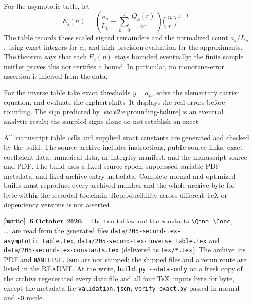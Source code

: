 \documentclass[11pt,letterpaper]{article}
\numberwithin{equation}{section}
\theoremstyle{remark}\newtheorem{remark}[theorem]{Remark}
\newcommand{\file}[1]{\nolinkurl{#1}}
\newenvironment{writenote}[1][]{\par\smallskip\begingroup\small
 \noindent\textbf{[write]}\if\relax\detokenize{#1}\relax\else~\textbf{#1.}\fi\ }%
 {\par\endgroup\smallskip}
\begin{document}
For the asymptotic table, let
\[
 E_j(n)=\left(\frac{a_n}{L_n}-\sum_{k=0}^j\frac{Q_k(r)}{n^k}\right)\left(\frac nr\right)^{j+1}.
\]
The table records these scaled signed remainders and the normalized count $a_n/L_n$, using exact integers for $a_n$ and high-precision evaluation for the approximants. The theorem says that each $E_j(n)$ stays bounded eventually; the finite sample neither proves this nor certifies a bound. In particular, no monotone-error assertion is inferred from the data.
\begin{table}[htbp]
\centering\small

\caption{Floating-point asymptotic diagnostics. Scaled signed remainders are not certified interval bounds.}\label{stc:s2:tab:asymptotic}
\end{table}

For the inverse table take exact thresholds $y=a_n$, solve the elementary carrier equation, and evaluate the explicit shifts. It displays the real errors before rounding. The sign predicted by \eqref{stc:s2:eq:rounding-failure} is an eventual analytic result; the sampled signs alone do not establish an onset.
\begin{table}[htbp]
\centering\small

\caption{Floating-point inverse diagnostics at exact thresholds. The carrier is numerically solved rather than replaced by a truncated Lambert seed.}\label{stc:s2:tab:inverse}
\end{table}

All manuscript table cells and supplied exact constants are generated and checked by the build. The source archive includes instructions, public source links, exact coefficient data, numerical data, an integrity manifest, and the manuscript source and PDF. The build uses a fixed source epoch, suppressed variable PDF metadata, and fixed archive entry metadata. Complete normal and optimized builds must reproduce every archived member and the whole archive byte-for-byte within the recorded toolchain. Reproducibility across different TeX or dependency versions is not asserted.

\begin{writenote}[6 October 2026]
The two tables and the constants \verb!\Qone!, \verb!\Cone!, \ldots\ are read from the generated files \file{data/205-second-tex-asymptotic_table.tex}, \file{data/205-second-tex-inverse_table.tex} and \file{data/205-second-tex-constants.tex} (delivered as \file{tex/*.tex}). The archive, its PDF and \file{MANIFEST.json} are not shipped; the shipped files and a rerun route are listed in the README. At the write, \texttt{build.py -{}-data-only} on a fresh copy of the archive regenerated every data file and all four \TeX\ inputs byte for byte, except the metadata file \file{validation.json}; \file{verify_exact.py} passed in normal and \texttt{-O} mode.
\end{writenote}
\end{document}
